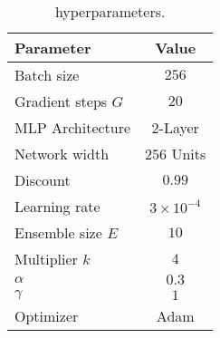 \begin{table}[H]
    \centering
    \begin{tabular}{l|c}
    \hline
        {\bf Parameter} & {\bf Value} \\
        \hline
        Batch size & $256$ \\
        Gradient steps $G$ & $20$ \\
        MLP Architecture & 2-Layer \\
        Network width & $256$ Units \\
        Discount & $0.99$ \\
        Learning rate & $3 \times 10^{-4}$ \\
        Ensemble size $E$ & $10$ \\
        Multiplier $k$ & $4$ \\
        $\alpha$ & $0.3$ \\
        $\gamma$ & $1$ \\
        Optimizer & Adam \\
        \hline
    \end{tabular}
    \caption{\algname hyperparameters.}
    \label{tab:hyperparams}
\end{table}



